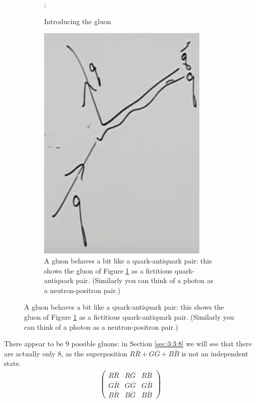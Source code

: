 \documentclass[]{article}
\begin{document}
\begin{figure}[H]
	\caption{A gluon behaves a bit like a quark-antiquark pair}
	\begin{subfigure}[t]{0.45\textwidth}
		\caption{Introducing the gluon}\label{fig2-2-gluon1}
		;
	\end{subfigure}
	\hfill
	\begin{subfigure}[t]{0.45\textwidth}
		\caption{A gluon behaves a bit like a quark-antiquark pair: this shows the gluon of Figure \ref{fig2-2-gluon1} as a fictitious quark-antiquark pair.  (Similarly you can think of a photon as a neutron-positron pair.)}
		\includegraphics[width=0.9\textwidth]{2-2-gluon2}
	\end{subfigure}

\end{figure}

There appear to be 9 possible gluons: in Section \ref{sec:3:3:8} we will see that there are actually only 8, as the superposition $R\bar{R}+G\bar{G}+B\bar{B}$ is not an independent state.
\begin{align*}
\begin{pmatrix}
R\bar{R}&R\bar{G}&R\bar{B}\\
G\bar{R}&G\bar{G}&G\bar{B}\\
B\bar{R}&B\bar{G}&B\bar{B}
\end{pmatrix}
\end{align*}
\end{document}
